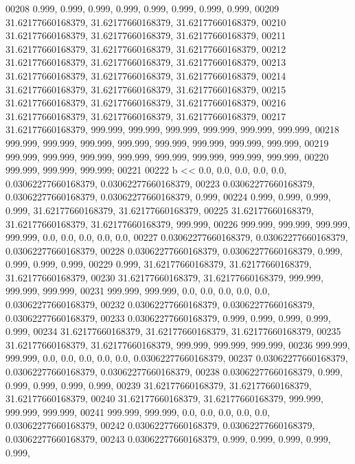 \begin{DoxyCode}
00208         0.999, 0.999, 0.999, 0.999, 0.999, 0.999, 0.999, 0.999,
00209         31.62177660168379, 31.62177660168379, 31.62177660168379,
00210         31.62177660168379, 31.62177660168379, 31.62177660168379,
00211         31.62177660168379, 31.62177660168379, 31.62177660168379,
00212         31.62177660168379, 31.62177660168379, 31.62177660168379,
00213         31.62177660168379, 31.62177660168379, 31.62177660168379,
00214         31.62177660168379, 31.62177660168379, 31.62177660168379,
00215         31.62177660168379, 31.62177660168379, 31.62177660168379,
00216         31.62177660168379, 31.62177660168379, 31.62177660168379,
00217         31.62177660168379, 999.999, 999.999, 999.999, 999.999, 999.999, 999.999,
00218         999.999, 999.999, 999.999, 999.999, 999.999, 999.999, 999.999, 999.999,
00219         999.999, 999.999, 999.999, 999.999, 999.999, 999.999, 999.999, 999.999,
00220         999.999, 999.999, 999.999;
00221 
00222     b << 0.0, 0.0, 0.0, 0.0, 0.0, 0.03062277660168379, 0.03062277660168379,
00223         0.03062277660168379, 0.03062277660168379, 0.03062277660168379, 0.999,
00224         0.999, 0.999, 0.999, 0.999, 31.62177660168379, 31.62177660168379,
00225         31.62177660168379, 31.62177660168379, 31.62177660168379, 999.999,
00226         999.999, 999.999, 999.999, 999.999, 0.0, 0.0, 0.0, 0.0, 0.0,
00227         0.03062277660168379, 0.03062277660168379, 0.03062277660168379,
00228         0.03062277660168379, 0.03062277660168379, 0.999, 0.999, 0.999, 0.999,
00229         0.999, 31.62177660168379, 31.62177660168379, 31.62177660168379,
00230         31.62177660168379, 31.62177660168379, 999.999, 999.999, 999.999,
00231         999.999, 999.999, 0.0, 0.0, 0.0, 0.0, 0.0, 0.03062277660168379,
00232         0.03062277660168379, 0.03062277660168379, 0.03062277660168379,
00233         0.03062277660168379, 0.999, 0.999, 0.999, 0.999, 0.999,
00234         31.62177660168379, 31.62177660168379, 31.62177660168379,
00235         31.62177660168379, 31.62177660168379, 999.999, 999.999, 999.999,
00236         999.999, 999.999, 0.0, 0.0, 0.0, 0.0, 0.0, 0.03062277660168379,
00237         0.03062277660168379, 0.03062277660168379, 0.03062277660168379,
00238         0.03062277660168379, 0.999, 0.999, 0.999, 0.999, 0.999,
00239         31.62177660168379, 31.62177660168379, 31.62177660168379,
00240         31.62177660168379, 31.62177660168379, 999.999, 999.999, 999.999,
00241         999.999, 999.999, 0.0, 0.0, 0.0, 0.0, 0.0, 0.03062277660168379,
00242         0.03062277660168379, 0.03062277660168379, 0.03062277660168379,
00243         0.03062277660168379, 0.999, 0.999, 0.999, 0.999, 0.999,

\end{DoxyCode}
